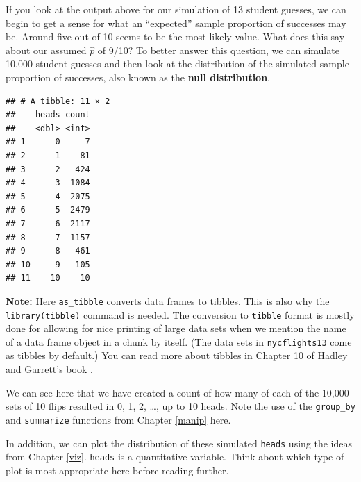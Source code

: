 \documentclass[]{tufte-book}
\newenvironment{Shaded}{\begin{snugshade}}{\end{snugshade}}
\newcommand{\KeywordTok}[1]{\textcolor[rgb]{0.13,0.29,0.53}{\textbf{{#1}}}}
\newcommand{\DataTypeTok}[1]{\textcolor[rgb]{0.13,0.29,0.53}{{#1}}}
\newcommand{\DecValTok}[1]{\textcolor[rgb]{0.00,0.00,0.81}{{#1}}}
\newcommand{\StringTok}[1]{\textcolor[rgb]{0.31,0.60,0.02}{{#1}}}
\newcommand{\NormalTok}[1]{{#1}}
\begin{document}
If you look at the output above for our simulation of 13 student
guesses, we can begin to get a sense for what an ``expected'' sample
proportion of successes may be. Around five out of 10 seems to be the
most likely value. What does this say about our assumed \(\hat{p}\) of
9/10? To better answer this question, we can simulate 10,000 student
guesses and then look at the distribution of the simulated sample
proportion of successes, also known as the \textbf{null distribution}.

\begin{Shaded}
\end{Shaded}

\begin{verbatim}
## # A tibble: 11 × 2
##    heads count
##    <dbl> <int>
## 1      0     7
## 2      1    81
## 3      2   424
## 4      3  1084
## 5      4  2075
## 6      5  2479
## 7      6  2117
## 8      7  1157
## 9      8   461
## 10     9   105
## 11    10    10
\end{verbatim}

\textbf{Note:} Here \texttt{as\_tibble} converts data frames to tibbles.
This is also why the \texttt{library(tibble)} command is needed. The
conversion to \texttt{tibble} format is mostly done for allowing for
nice printing of large data sets when we mention the name of a data
frame object in a chunk by itself. (The data sets in
\texttt{nycflights13} come as tibbles by default.) You can read more
about tibbles in Chapter 10 of Hadley and Garrett's book
\citep{rds2016}.

We can see here that we have created a count of how many of each of the
10,000 sets of 10 flips resulted in 0, 1, 2, \ldots{}, up to 10 heads.
Note the use of the \texttt{group\_by} and \texttt{summarize} functions
from Chapter \ref{manip} here.

In addition, we can plot the distribution of these simulated
\texttt{heads} using the ideas from Chapter \ref{viz}. \texttt{heads} is
a quantitative variable. Think about which type of plot is most
appropriate here before reading further.
\end{document}
